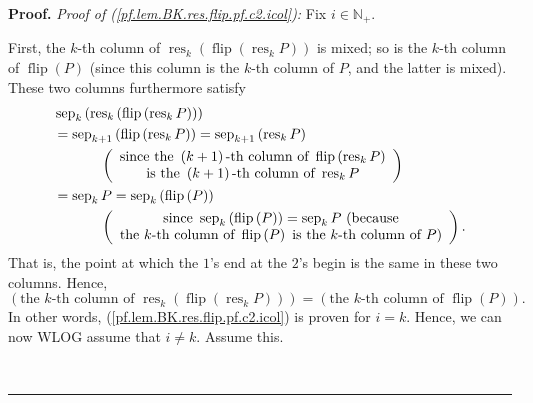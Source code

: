 \documentclass[numbers=enddot,12pt,final,onecolumn,notitlepage]{scrartcl}%
\theoremstyle{definition}
\newenvironment{proof}[1][Proof]{\noindent\textbf{#1.} }{\ \rule{0.5em}{0.5em}}
\begin{document}
\begin{proof}
\textit{Proof of (\ref{pf.lem.BK.res.flip.pf.c2.icol}):} Fix $i\in
\mathbb{N}_{+}$.

First, the $k$-th column of $\operatorname*{res}\nolimits_{k}\left(
\operatorname*{flip}\left(  \operatorname*{res}\nolimits_{k}P\right)  \right)
$ is mixed; so is the $k$-th column of $\operatorname*{flip}\left(  P\right)
$ (since this column is the $k$-th column of $P$, and the latter is mixed).
These two columns furthermore satisfy%
\begin{align*}
&  \operatorname*{sep}\nolimits_{k}\left(  \operatorname*{res}\nolimits_{k}%
\left(  \operatorname*{flip}\left(  \operatorname*{res}\nolimits_{k}P\right)
\right)  \right) \\
&  =\operatorname*{sep}\nolimits_{k+1}\left(  \operatorname*{flip}\left(
\operatorname*{res}\nolimits_{k}P\right)  \right)  =\operatorname*{sep}%
\nolimits_{k+1}\left(  \operatorname*{res}\nolimits_{k}P\right) \\
&  \ \ \ \ \ \ \ \ \ \ \left(
\begin{array}
[c]{c}%
\text{since the }\left(  k+1\right)  \text{-th column of }\operatorname*{flip}%
\left(  \operatorname*{res}\nolimits_{k}P\right) \\
\text{is the }\left(  k+1\right)  \text{-th column of }\operatorname*{res}%
\nolimits_{k}P
\end{array}
\right) \\
&  =\operatorname*{sep}\nolimits_{k}P=\operatorname*{sep}\nolimits_{k}\left(
\operatorname*{flip}\left(  P\right)  \right) \\
&  \ \ \ \ \ \ \ \ \ \ \left(
\begin{array}
[c]{c}%
\text{since }\operatorname*{sep}\nolimits_{k}\left(  \operatorname*{flip}%
\left(  P\right)  \right)  =\operatorname*{sep}\nolimits_{k}P\text{
(because}\\
\text{the }k\text{-th column of }\operatorname*{flip}\left(  P\right)  \text{
is the }k\text{-th column of }P\text{)}%
\end{array}
\right)  .
\end{align*}
That is, the point at which the $1$'s end at the $2$'s begin is the same in
these two columns. Hence,%
\[
\left(  \text{the }k\text{-th column of }\operatorname*{res}\nolimits_{k}%
\left(  \operatorname*{flip}\left(  \operatorname*{res}\nolimits_{k}P\right)
\right)  \right)  =\left(  \text{the }k\text{-th column of }%
\operatorname*{flip}\left(  P\right)  \right)  .
\]
In other words, (\ref{pf.lem.BK.res.flip.pf.c2.icol}) is proven for $i=k$.
Hence, we can now WLOG assume that $i\neq k$. Assume this.


\end{proof}
\end{document}
